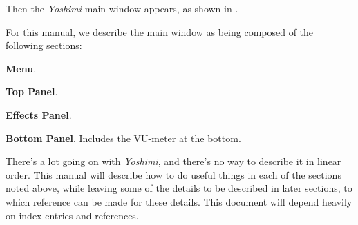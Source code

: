 \documentclass[
 11pt,
 twoside,
 a4paper,
 headinclude,
 footinclude,
 final                                 %
]{article}
\begin{document}
   
   Then the \textsl{Yoshimi} main window appears, as shown in
   .

   For this manual, we describe the main window as being composed of
   the following sections:

\begin{enumber}
   \item \textbf{Menu}.
   \item \textbf{Top Panel}.
   \item \textbf{Effects Panel}.
   \item \textbf{Bottom Panel}.  Includes the VU-meter at the bottom.
\end{enumber}

There's a lot going on with \textsl{Yoshimi}, and there's no way
to describe it in linear order.  This manual will describe how to do useful
things in each of the sections noted above, while leaving some of the
details to be described in later sections, to which reference can be made
for these details.  This document will depend heavily on index entries and
references.




























\end{document}

